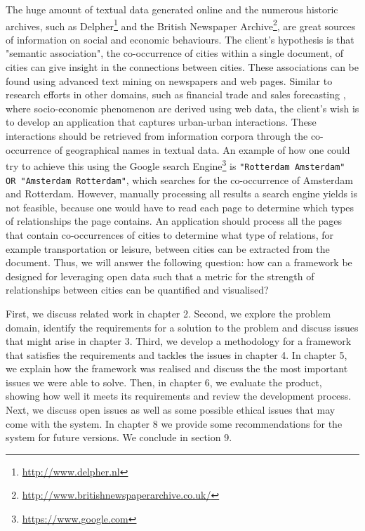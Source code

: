 The huge amount of textual data generated online and the numerous historic archives, such as Delpher\footnote{\url{http://www.delpher.nl}} and the British Newspaper Archive\footnote{\url{http://www.britishnewspaperarchive.co.uk/}}, are great sources of information on social and economic behaviours. The client's hypothesis is that "semantic association", the co-occurrence of cities within a single document, of cities can give insight in the connections between cities. These associations can be found using advanced text mining on newspapers and web pages. Similar to research efforts in other domains, such as financial trade \cite{preis2013quantifying} and sales forecasting \cite{wu2014future}, where socio-economic phenomenon are derived using web data, the client's wish is to develop an application that captures urban-urban interactions. These interactions should be retrieved from information corpora through the co-occurrence of geographical names in textual data. An example of how one could try to achieve this using the Google search Engine\footnote{\url{https://www.google.com}} is \texttt{"Rotterdam Amsterdam" OR "Amsterdam Rotterdam"}, which searches for the co-occurrence of Amsterdam and Rotterdam. However, manually processing all results a search engine yields is not feasible, because one would have to read each page to determine which types of relationships the page contains. An application should process all the pages that contain co-occurrences of cities to determine what type of relations, for example transportation or leisure, between cities can be extracted from the document. Thus, we will answer the following question: 
how can a framework be designed for leveraging open data such that a metric for the strength of relationships between cities can be quantified and visualised?


First, we discuss related work in chapter 2. Second, we explore the problem domain, identify the requirements for a solution to the problem and discuss issues that might arise in chapter 3. Third, we develop a methodology for a framework that satisfies the requirements and tackles the issues in chapter 4. In chapter 5, we explain how the framework was realised and discuss the the most important issues we were able to solve. Then, in chapter 6, we evaluate the product, showing how well it meets its requirements and review the development process. Next, we discuss open issues as well as some possible ethical issues that may come with the system. In chapter 8 we provide some recommendations for the system for future versions. We conclude in section 9.
